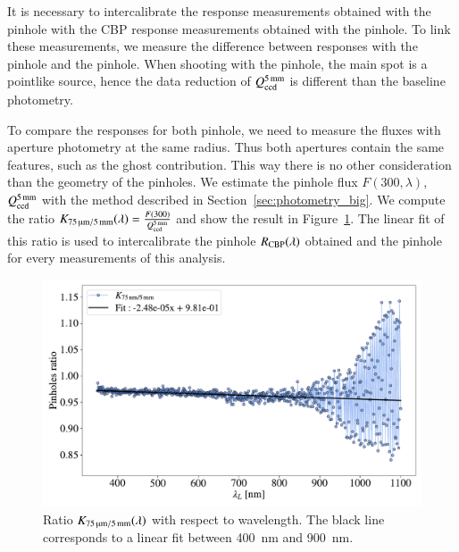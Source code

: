It is necessary to intercalibrate the \SD response measurements obtained with the \spinhole pinhole with the CBP response measurements obtained with the \bpinhole pinhole. To link these measurements, we measure the difference between \SD responses with the \spinhole pinhole and the \bpinhole pinhole. When shooting with the \bpinhole pinhole, the main spot is a pointlike source, hence the data reduction of $Q_{\mathrm{ccd}}^{\SI{5}{\milli\meter}}$ is different than the baseline photometry.

To compare the \SD responses for both pinhole, we need to measure the fluxes with aperture photometry at the same radius. Thus both apertures contain the same features, such as the ghost contribution. This way there is no other consideration than the geometry of the pinholes. We estimate the \spinhole pinhole flux $F(300, \lambda)$, $Q_{\mathrm{ccd}}^{\SI{5}{\milli\meter}}$ with the method described in Section~\ref{sec:photometry_big}. We compute the ratio $K_\mathrm{\SI{75}{\micro\meter}/\SI{5}{\milli\meter}}(\lambda)=\frac{F(300)}{Q_{\mathrm{ccd}}^{\SI{5}{\milli\meter}}}$ and show the result in Figure~\ref{fig:ratio_pinholes}. The linear fit of this ratio is used to intercalibrate the \bpinhole pinhole $R_{\mathrm{CBP}}(\lambda)$ obtained and the \spinhole pinhole \SD for every measurements of this analysis.



\begin{figure}[h]
    \centering
    \includegraphics[width=\columnwidth]{fig/ratio_pinholes.pdf}
    \caption{Ratio $K_\mathrm{\SI{75}{\micro\meter}/\SI{5}{\milli\meter}}(\lambda)$ with respect to wavelength. The black line corresponds to a linear fit between \SI{400}{\nm} and \SI{900}{\nm}.}
    \label{fig:ratio_pinholes}
\end{figure}

